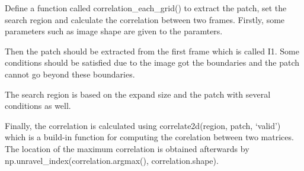 \documentclass[11pt]{article}
\begin{document}
    Define a function called correlation\_each\_grid() to extract the patch,
set the search region and calculate the correlation between two frames.
Firstly, some parameters such as image shape are given to the paramters.

Then the patch should be extracted from the first frame which is called
I1. Some conditions should be satisfied due to the image got the
boundaries and the patch cannot go beyond these boundaries.

The search region is based on the expand size and the patch with several
conditions as well.

Finally, the correlation is calculated using correlate2d(region, patch,
`valid') which is a build-in function for computing the corelation
between two matrices. The location of the maximum correlation is
obtained afterwards by np.unravel\_index(correlation.argmax(),
correlation.shape).
\end{document}
